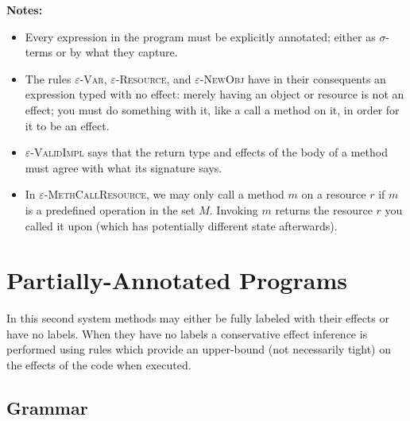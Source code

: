 \documentclass{llncs}
\begin{document}
\noindent \textbf{Notes:}

\begin{itemize}
	\item Every expression in the program must be explicitly annotated; either as $\sigma$-terms or by what they capture.
	\item The rules \textsc{$\varepsilon$-Var}, \textsc{$\varepsilon$-Resource}, and \textsc{$\varepsilon$-NewObj} have in their consequents an expression typed with no effect: merely having an object or resource is not an effect; you must do something with it, like a call a method on it, in order for it to be an effect.
	\item \textsc{$\varepsilon$-ValidImpl} says that the return type and effects of the body of a method must agree with what its signature says.
	\item In \textsc{$\varepsilon$-MethCallResource}, we may only call a method $m$ on a resource $r$ if $m$ is a predefined operation in the set $M$. Invoking $m$ returns the resource $r$ you called it upon (which has potentially different state afterwards).
\end{itemize}





\newpage



\section{Partially-Annotated Programs}

In this second system methods may either be fully labeled with their effects or have no labels. When they have no labels a conservative effect inference is performed using rules which provide an upper-bound (not necessarily tight) on the effects of the code when executed.

\subsection{Grammar}
\end{document}
